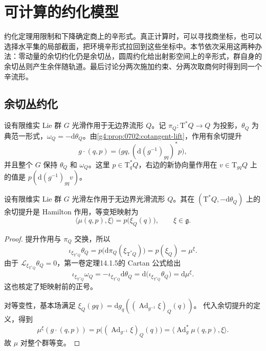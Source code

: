 
% 
% 

\section{可计算的约化模型}
\label{g4:sec:1003}

约化定理用限制和下降确定商上的辛形式。真正计算时，可以寻找商坐标，也可以选择水平集的局部截面，把环境辛形式拉回到这些坐标中。本节依次采用这两种办法：零动量的余切约化仍是余切丛，圆周约化给出射影空间上的辛形式，群自身的余切丛则产生余伴随轨道。最后讨论分两次施加约束、分两次取商何时得到同一个辛流形。

\subsection{余切丛约化}
\label{g4:subsec:1003:01}

设有限维实 Lie 群 \(G\) 光滑作用于无边界流形 \(Q\)。记 \(\pi_Q:\mathrm{T}^*Q\to Q\) 为投影，\(\theta_Q\) 为典范一形式，\(\omega_Q=-\mathrm{d}\theta_Q\)。由\cref{g4:prop:0702:cotangent-lift}，作用有余切提升
\[
	g\cdot(q,p)=\bigl(gq,(\mathrm{d}(g^{-1})_{gq})^*p\bigr),
\]
并且整个 \(G\) 保持 \(\theta_Q\) 和 \(\omega_Q\)。这里 \(p\in\mathrm{T}_q^*Q\)，右边的新协向量作用在 \(v\in\mathrm{T}_{gq}Q\) 上的值是 \(p(\mathrm{d}(g^{-1})_{gq}v)\)。

\begin{proposition}\label{g4:prop:1003:cotangent-moment}
	设有限维实 Lie 群 \(G\) 光滑左作用于无边界光滑流形 \(Q\)。其在 \((\mathrm{T}^*Q,-\mathrm{d}\theta_Q)\) 上的余切提升是 Hamilton 作用，等变矩映射为
	\begin{equation}\label{g4:eq:1003:cotangent-moment}
		\langle\mu(q,p),\xi\rangle=p\bigl(\xi_Q(q)\bigr),
		\qquad \xi\in\mathfrak g.
	\end{equation}
\end{proposition}
\begin{proof}
	提升作用与 \(\pi_Q\) 交换，所以
	\[
		\iota_{\xi_{\mathrm{T}^*Q}}\theta_Q
		=p\bigl(\mathrm{d}\pi_Q(\xi_{\mathrm{T}^*Q})\bigr)
		=p(\xi_Q)=\mu^\xi.
	\]
	由于 \(\mathcal L_{\xi_{\mathrm{T}^*Q}}\theta_Q=0\)，第一卷定理14.1.5的 Cartan 公式给出
	\[
		\iota_{\xi_{\mathrm{T}^*Q}}\omega_Q
		=-\iota_{\xi_{\mathrm{T}^*Q}}\mathrm{d}\theta_Q
		=\mathrm{d}\bigl(\iota_{\xi_{\mathrm{T}^*Q}}\theta_Q\bigr)
		=\mathrm{d}\mu^\xi.
	\]
	这也核定了矩映射前的正号。

	对等变性，基本场满足
	\(\xi_Q(gq)=\mathrm{d}g_q((\operatorname{Ad}_{g^{-1}}\xi)_Q(q))\)。
	代入余切提升的定义，得到
	\[
		\mu^\xi(g\cdot(q,p))
		=p\bigl((\operatorname{Ad}_{g^{-1}}\xi)_Q(q)\bigr)
		=\langle\operatorname{Ad}_g^*\mu(q,p),\xi\rangle.
	\]
	故 \(\mu\) 对整个群等变。
\end{proof}

